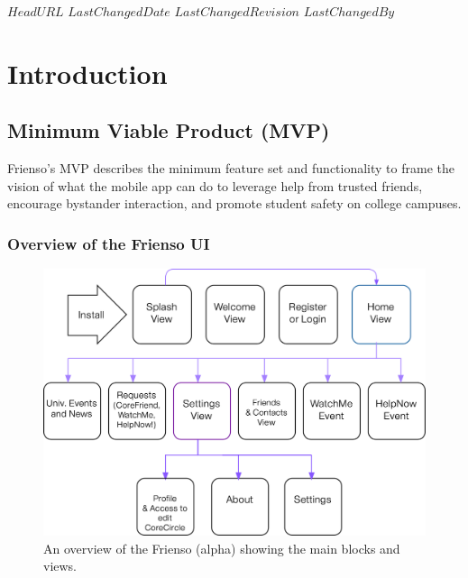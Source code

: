 \svnidlong
{$HeadURL$}
{$LastChangedDate$}
{$LastChangedRevision$}
{$LastChangedBy$}

\chapter{Introduction}

\begin{introduction}
\end{introduction}

\section{Minimum Viable Product (MVP)}
  \begin{introduction}
  Frienso's MVP describes the minimum feature set and functionality to frame the vision
  of what the mobile app can do to leverage help from trusted friends, encourage bystander
  interaction, and promote student safety on college campuses.
  \end{introduction}

\subsection{Overview of the Frienso UI}
\begin{figure}[ht!]
 \centering
  \includegraphics[width=\textwidth]{images/flowchart.png}
	\caption{
	An overview of the Frienso (alpha) showing the main blocks and views. 
	}
	\end{figure}
	

